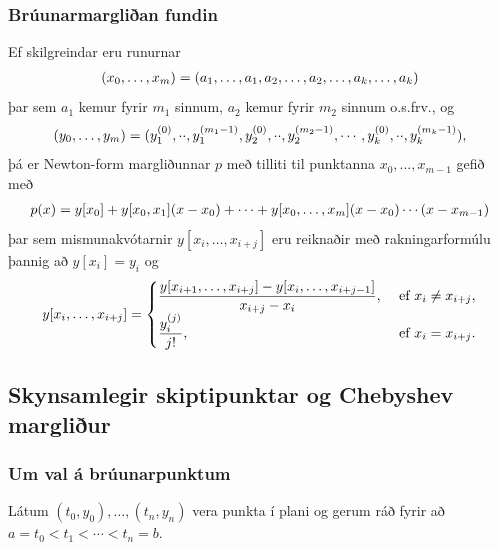 \documentclass[a4paper,10pt,icelandic]{sphinxmanual}
\begin{document}
\subsubsection{Brúunarmargliðan fundin}
\label{kafli03:bruunarmarglian-fundin}
Ef skilgreindar eru runurnar
\begin{gather}
\begin{split}(x_0,\dots,x_m)=(a_1,\dots,a_1,a_2,\dots,a_2,\dots,a_k,\dots,a_k)\end{split}\notag
\end{gather}
þar sem \(a_1\) kemur fyrir \(m_1\) sinnum, \(a_2\) kemur
fyrir \(m_2\) sinnum o.s.frv., og
\begin{gather}
\begin{split}(y_0,\dots,y_m)=(y_1^{(0)},\cdot\cdot,y_1^{(m_1-1)},y_2^{(0)},\cdot\cdot,y_2^{(m_2-1)},
\cdots,y_k^{(0)},\cdot\cdot,y_k^{(m_k-1)}),\end{split}\notag
\end{gather}
þá er Newton-form margliðunnar \(p\) með tilliti til punktanna
\(x_0,\dots,x_{m-1}\) gefið með
\begin{gather}
\begin{split}p(x)=y[x_0]+y[x_0,x_1](x-x_0)+\cdots+y[x_0,\dots,x_m](x-x_0)\cdots(x-x_{m-1})\end{split}\notag
\end{gather}
þar sem mismunakvótarnir \(y[x_i,\ldots,x_{i+j}]\) eru reiknaðir með
rakningarformúlu þannig að \(y[x_i]=y_i\) og
\begin{gather}
\begin{split}y[x_i,\ldots,x_{i+j}]
  = \begin{cases}\dfrac{y[x_{i+1},\ldots,x_{i+j}] - y[x_i,\ldots,x_{i+j-1}]}
  {x_{i+j} - x_i}, &\text{ ef } x_i\neq x_{i+j},\\
\dfrac{y^{(j)}_i}{j!}, &\text{ ef } x_i=x_{i+j}.
\end{cases}\end{split}\notag
\end{gather}

\subsection{Skynsamlegir skiptipunktar og Chebyshev margliður}
\label{kafli03:skynsamlegir-skiptipunktar-og-chebyshev-margliur}

\subsubsection{Um val á brúunarpunktum}
\label{kafli03:um-val-a-bruunarpunktum}
Látum \((t_0,y_0),\dots,(t_n,y_n)\) vera punkta í plani og gerum ráð
fyrir að \(a=t_0<t_1<\cdots<t_n=b\).
\end{document}
